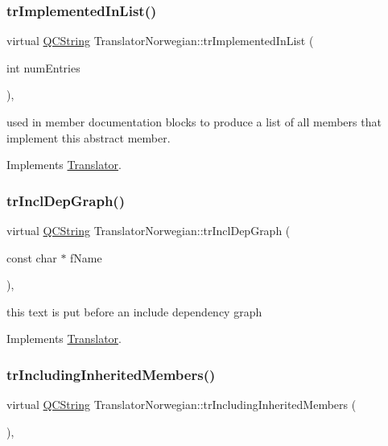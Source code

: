 \subsubsection{\texorpdfstring{trImplementedInList()}{trImplementedInList()}}
{\footnotesize\ttfamily virtual \mbox{\hyperlink{class_q_c_string}{Q\+C\+String}} Translator\+Norwegian\+::tr\+Implemented\+In\+List (\begin{DoxyParamCaption}\item[{int}]{num\+Entries }\end{DoxyParamCaption})\hspace{0.3cm}{\ttfamily [inline]}, {\ttfamily [virtual]}}

used in member documentation blocks to produce a list of all members that implement this abstract member. 

Implements \mbox{\hyperlink{class_translator}{Translator}}.

\mbox{\label{class_translator_norwegian_a879742954ba446b8d26b7d2eced9b02a}} 
\subsubsection{\texorpdfstring{trInclDepGraph()}{trInclDepGraph()}}
{\footnotesize\ttfamily virtual \mbox{\hyperlink{class_q_c_string}{Q\+C\+String}} Translator\+Norwegian\+::tr\+Incl\+Dep\+Graph (\begin{DoxyParamCaption}\item[{const char $\ast$}]{f\+Name }\end{DoxyParamCaption})\hspace{0.3cm}{\ttfamily [inline]}, {\ttfamily [virtual]}}

this text is put before an include dependency graph 

Implements \mbox{\hyperlink{class_translator}{Translator}}.

\mbox{\label{class_translator_norwegian_a91dc931102056f982b818724a0467a13}} 
\subsubsection{\texorpdfstring{trIncludingInheritedMembers()}{trIncludingInheritedMembers()}}
{\footnotesize\ttfamily virtual \mbox{\hyperlink{class_q_c_string}{Q\+C\+String}} Translator\+Norwegian\+::tr\+Including\+Inherited\+Members (\begin{DoxyParamCaption}{ }\end{DoxyParamCaption})\hspace{0.3cm}{\ttfamily [inline]}, {\ttfamily [virtual]}}

